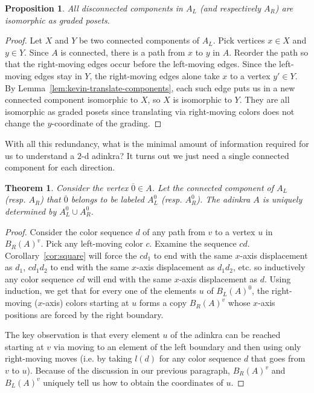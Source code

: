 \documentclass[12pt,twoside,singlespace]{article}
\numberwithin{equation}{section}
\newtheorem{thm}[equation]{Theorem}
\newtheorem{prop}[equation]{Proposition}
\theoremstyle{definition}
\begin{document}
\begin{prop}
\label{prop:kevin}
All disconnected components in $A_L$ (and respectively $A_R$) are isomorphic as graded posets.
\end{prop}
\begin{proof}
Let $X$ and $Y$ be two connected components of $A_L$. Pick vertices $x \in X$ and $y \in Y$. Since $A$ is connected, there is a path from $x$ to $y$ in $A$. Reorder the path so that the right-moving edges occur before the left-moving edges. Since the left-moving edges stay in $Y$, the right-moving edges alone take $x$ to a vertex $y' \in Y$. By Lemma~\ref{lem:kevin-translate-components}, each such edge puts us in a new connected component isomorphic to $X$, so $X$ is isomorphic to $Y$. They are all isomorphic as graded posets since translating via right-moving colors does not change the $y$-coordinate of the grading.
\end{proof}


With all this redundancy, what is the minimal amount of information required for us to understand a $2$-d adinkra? It turns out we just need a single connected component for each direction.

\begin{thm}
\label{thm:connected component factorization}
Consider the vertex $\overline{0} \in A$. Let the connected component of $A_L$ (resp. $A_R$) that $\overline{0}$ belongs to be labeled $A_L^0$ (resp. $A_R^0$). The adinkra $A$ is uniquely determined by $A_L^0 \cup A_R^0$.
\end{thm}
\begin{proof}
Consider the color sequence $d$ of any path from $v$ to a vertex $u$ in $B_R(A)^v$. Pick any left-moving color $c$. Examine the sequence $cd$. Corollary~\ref{cor:square} will force the $cd_1$ to end with the same $x$-axis displacement as $d_1$, $cd_1d_2$ to end with the same $x$-axis displacement as $d_1d_2$, etc. so inductively any color sequence $cd$ will end with the same $x$-axis displacement as $d$. Using induction, we get that for every one of the elements $u$ of $B_L(A)^0$, the right-moving ($x$-axis) colors starting at $u$ forms a copy $B_R(A)^v$ whose $x$-axis positions are forced by the right boundary. 

The key observation is that every element $u$ of the adinkra can be reached starting at $v$ via moving to an element of the left boundary and then using only right-moving moves (i.e. by taking $l(d)$ for any color sequence $d$ that goes from $v$ to $u$). Because of the discussion in our previous paragraph, $B_R(A)^v$ and $B_L(A)^v$ uniquely tell us how to obtain the coordinates of $u$.
\end{proof}
\end{document}
